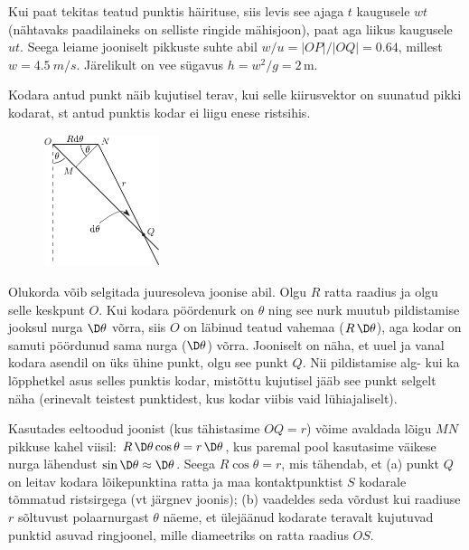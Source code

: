 \documentclass[10pt]{article}
\begin{document}
{\osa
Kui paat tekitas teatud punktis häirituse, siis levis see ajaga $t$ kaugusele $wt$ (nähtavaks paadilaineks on selliste ringide mähisjoon),
paat aga liikus kaugusele $ut$. Seega leiame jooniselt pikkuste suhte abil $w/u=|OP|/|OQ|=\num{0.64}$, millest $w=\SI{4.5}{m/s}$. Järelikult on vee sügavus
$h=w^2/g=2\,$m.
\probend
\bigskip


\solu
Kodara antud punkt näib kujutisel terav, kui selle kiirusvektor on suunatud pikki kodarat, st antud punktis kodar ei liigu enese ristsihis.

\begin{figure}
	\vspace*{-15pt}
	\includegraphics[width=0.3\textwidth]{2011-lahg-10-kodar_a}
	\vspace*{-25pt}
\end{figure}

Olukorda võib selgitada juuresoleva joonise abil.
Olgu $R$ ratta raadius ja olgu selle keskpunt $O$. Kui kodara pöördenurk on $\theta$ ning see nurk muutub pildistamise jooksul nurga $\D\theta$ võrra,
siis $O$ on läbinud teatud vahemaa ($R \, \D\theta$), aga kodar on samuti pöördunud sama nurga ($\D \theta$) võrra.
Jooniselt on näha, et uuel ja vanal kodara asendil on üks ühine punkt, olgu see punkt $Q$. Nii pildistamise alg- kui ka lõpphetkel asus selles punktis kodar, mistõttu kujutisel jääb see punkt selgelt näha (erinevalt teistest punktidest, kus kodar viibis vaid lühiajaliselt).

Kasutades eeltoodud joonist (kus tähistasime $OQ = r$) võime avaldada lõigu $MN$
pikkuse kahel viisil: $R \,\D \theta \cos \theta = r \,\D \theta$, kus
paremal pool kasutasime väikese nurga lähendust $\sin \D\theta\approx \D\theta$. Seega $R \cos \theta = r$, mis tähendab, et
(a) punkt $Q$ on leitav kodara lõikepunktina ratta ja maa kontaktpunktist $S$ kodarale tõmmatud ristsirgega (vt järgnev joonis);
(b) vaadeldes seda võrdust kui raadiuse $r$ sõltuvust polaarnurgast $\theta$ näeme, et ülejäänud kodarate teravalt kujutuvad punktid asuvad ringjoonel,
mille diameetriks on ratta raadius $OS$.

}
\end{document}
